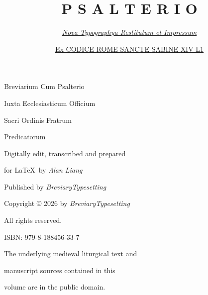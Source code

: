 \documentclass[openany]{book}
\title{\fontsize{28}{24}\selectfont \color{Red} P S A L T E R I O \vspace{+.5em}}
\author{\color{black} \underline{\color{black} \itshape \large Nova Typographya Restitutum et Impressum}\\ \vspace{+.5em}}
\date{\color{Red} \large \mdseries \underline{\underline{\color{black} {\Large E}x \normalsize {\Large C}ODICE {\Large R}OME {\Large S}ANCTE {\Large S}ABINE {\Large XIV L1}}}\\ \vspace{+.85em}}
\renewcommand{\\}{\par\hspace*{.1em}} %
\renewcommand{\newline}{\par \noindent}
\begin{document}
\fontsize{9pt}{11pt}\selectfont %

\frontmatter


\maketitle

\clearpage
{}
\thispagestyle{empty}


\vspace{+7em}
\begin{center}
\large
Breviarium Cum Psalterio
\newline Iuxta Ecclesiasticum Officium
\newline Sacri Ordinis Fratrum
\newline Predicatorum
\end{center}
\begin{center}

\end{center}
\begin{center}

\newline Digitally edit, transcribed and prepared
\newline for \LaTeX \ by \emph{Alan Liang}
\end{center}
\begin{center}

\newline Published by \emph{BreviaryTypesetting}
\end{center}
\begin{center}

\newline Copyright © 2026 by \emph{BreviaryTypesetting}
\newline All rights reserved.
\end{center}
\begin{center}

\newline ISBN: 979-8-188456-33-7
\end{center}
\begin{center}

The underlying medieval liturgical text and 
\newline manuscript sources contained in this
\newline volume are in the public domain.
\end{center}
\end{document}

